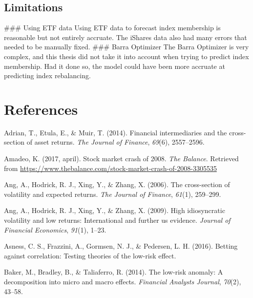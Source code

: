 \documentclass[12pt,twoside]{reedthesis}
\theoremstyle{definition}
\theoremstyle{definition}
\theoremstyle{definition}
\theoremstyle{remark}
\begin{document}
\section{Limitations}\label{limitations}

\hfill\break
\#\#\# Using ETF data Using ETF data to forecast index membership is
reasonable but not entirely accruate. The iShares data also had many
errors that needed to be manually fixed. \hfill\break
\#\#\# Barra Optimizer The Barra Optimizer is very complex, and this
thesis did not take it into account when trying to predict index
membership. Had it done so, the model could have been more accruate at
predicting index rebalancing.

\backmatter

\chapter*{References}\label{references}


\noindent

\setlength{\parindent}{-0.20in} \setlength{\leftskip}{0.20in}
\setlength{\parskip}{8pt}

\hypertarget{refs}{}
\hypertarget{ref-adrian2014}{}
Adrian, T., Etula, E., \& Muir, T. (2014). Financial intermediaries and
the cross-section of asset returns. \emph{The Journal of Finance},
\emph{69}(6), 2557--2596.

\hypertarget{ref-amadeo2017}{}
Amadeo, K. (2017, april). Stock market crash of 2008. \emph{The
Balance}. Retrieved from
\url{https://www.thebalance.com/stock-market-crash-of-2008-3305535}

\hypertarget{ref-ang2006}{}
Ang, A., Hodrick, R. J., Xing, Y., \& Zhang, X. (2006). The
cross-section of volatility and expected returns. \emph{The Journal of
Finance}, \emph{61}(1), 259--299.

\hypertarget{ref-ang2009}{}
Ang, A., Hodrick, R. J., Xing, Y., \& Zhang, X. (2009). High
idiosyncratic volatility and low returns: International and further us
evidence. \emph{Journal of Financial Economics}, \emph{91}(1), 1--23.

\hypertarget{ref-asness2016}{}
Asness, C. S., Frazzini, A., Gormsen, N. J., \& Pedersen, L. H. (2016).
Betting against correlation: Testing theories of the low-risk effect.

\hypertarget{ref-baker2014}{}
Baker, M., Bradley, B., \& Taliaferro, R. (2014). The low-risk anomaly:
A decomposition into micro and macro effects. \emph{Financial Analysts
Journal}, \emph{70}(2), 43--58.
\end{document}
